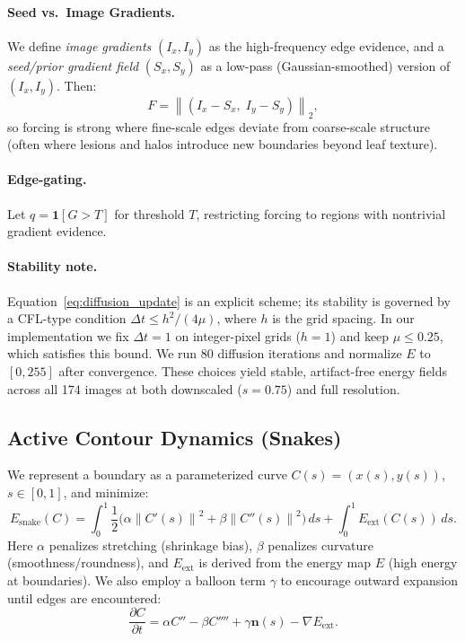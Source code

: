 \documentclass[11pt,a4paper]{article}
\newcommand{\grad}{\nabla}
\newcommand{\norm}[1]{\left\lVert #1 \right\rVert}
\begin{document}
\paragraph{Seed vs.\ Image Gradients.}
We define \emph{image gradients} $(I_x,I_y)$ as the high-frequency edge evidence, and a \emph{seed/prior gradient field} $(S_x,S_y)$ as a low-pass (Gaussian-smoothed) version of $(I_x,I_y)$. Then:
\begin{equation}
F = \norm{(I_x-S_x,\; I_y-S_y)}_2,
\end{equation}
so forcing is strong where fine-scale edges deviate from coarse-scale structure (often where lesions and halos introduce new boundaries beyond leaf texture).

\paragraph{Edge-gating.}
Let $q = \mathbf{1}[G > T]$ for threshold $T$, restricting forcing to regions with nontrivial gradient evidence.

\paragraph{Stability note.}
Equation~\eqref{eq:diffusion_update} is an explicit scheme; its stability is governed by a CFL-type condition $\Delta t \leq h^2/(4\mu)$, where $h$ is the grid spacing. In our implementation we fix $\Delta t = 1$ on integer-pixel grids ($h=1$) and keep $\mu\leq 0.25$, which satisfies this bound. We run 80 diffusion iterations and normalize $E$ to $[0,255]$ after convergence. These choices yield stable, artifact-free energy fields across all 174 images at both downscaled ($s{=}0.75$) and full resolution.

\subsection{Active Contour Dynamics (Snakes)}
We represent a boundary as a parameterized curve $C(s) = (x(s), y(s))$, $s\in[0,1]$, and minimize:
\begin{equation}
E_{\mathrm{snake}}(C) = \int_0^1 \frac{1}{2}\Big(\alpha \norm{C'(s)}^2 + \beta \norm{C''(s)}^2\Big)\,ds + \int_0^1 E_{\mathrm{ext}}(C(s))\,ds.
\end{equation}
Here $\alpha$ penalizes stretching (shrinkage bias), $\beta$ penalizes curvature (smoothness/roundness), and $E_{\mathrm{ext}}$ is derived from the energy map $E$ (high energy at boundaries). We also employ a balloon term $\gamma$ to encourage outward expansion until edges are encountered:
\begin{equation}
\frac{\partial C}{\partial t} = \alpha C'' - \beta C'''' + \gamma \mathbf{n}(s) - \grad E_{\mathrm{ext}}.
\end{equation}
\end{document}
